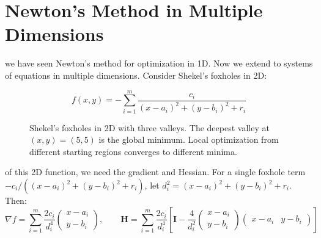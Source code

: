 


\newpage

\section{Newton's Method in Multiple Dimensions}
  

 we have seen Newton's method for optimization in 1D. Now we extend to systems of equations in multiple dimensions. Consider Shekel's foxholes in 2D:

\begin{equation}
    f(x, y) = -\sum_{i=1}^{m} \frac{c_i}{(x - a_i)^2 + (y - b_i)^2 + r_i}
\end{equation}

\begin{figure}[h]
    \centering
    \caption{Shekel's foxholes in 2D with three valleys. The deepest valley at $(x,y) = (5,5)$ is the global minimum. Local optimization from different starting regions converges to different minima.}
    \label{fig:shekel_foxholes_2d}
\end{figure}

 of this 2D function, we need the gradient and Hessian. For a single foxhole term $-c_i / ((x-a_i)^2 + (y-b_i)^2 + r_i)$, let $d_i^2 = (x-a_i)^2 + (y-b_i)^2 + r_i$. Then:
\begin{equation}
    \nabla f = \sum_{i=1}^{m} \frac{2c_i}{d_i^4} \begin{pmatrix} x - a_i \\ y - b_i \end{pmatrix}, \qquad
    \mathbf{H} = \sum_{i=1}^{m} \frac{2c_i}{d_i^4} \left[ \mathbf{I} - \frac{4}{d_i^2} \begin{pmatrix} x-a_i \\ y-b_i \end{pmatrix} \begin{pmatrix} x-a_i & y-b_i \end{pmatrix} \right]
\end{equation}


